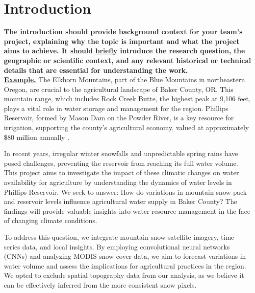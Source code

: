 \documentclass[10pt,twocolumn,letterpaper]{article}
\begin{document}
\section{Introduction}

\textbf{The introduction should provide background context for your team's project, explaining why the topic is important and what the project aims to achieve. It should \underline{briefly} introduce the research question, the geographic or scientific context, and any relevant historical or technical details that are essential for understanding the work.}
\\
\underline{\textbf{Example.}} The Elkhorn Mountains, part of the Blue Mountains in northeastern Oregon, are crucial to the agricultural landscape of Baker County, OR. This mountain range, which includes Rock Creek Butte, the highest peak at 9,106 feet, plays a vital role in water storage and management for the region. Phillips Reservoir, formed by Mason Dam on the Powder River, is a key resource for irrigation, supporting the county’s agricultural economy, valued at approximately \$80 million annually \cite{USDA2022}.

In recent years, irregular winter snowfalls and unpredictable spring rains have posed challenges, preventing the reservoir from reaching its full water volume. This project aims to investigate the impact of these climatic changes on water availability for agriculture by understanding the dynamics of water levels in Phillips Reservoir. We seek to answer: How do variations in mountain snow pack and reservoir levels influence agricultural water supply in Baker County? The findings will provide valuable insights into water resource management in the face of changing climate conditions.

To address this question, we integrate mountain snow satellite imagery, time series data, and local insights. By employing convolutional neural networks (CNNs) and analyzing MODIS snow cover data, we aim to forecast variations in water volume and assess the implications for agricultural practices in the region. We opted to exclude spatial topography data from our analysis, as we believe it can be effectively inferred from the more consistent snow pixels.
\end{document}
